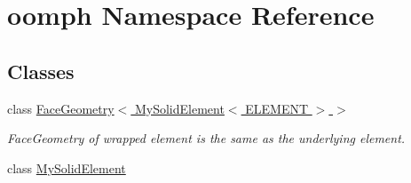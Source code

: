 \hypertarget{namespaceoomph}{}\section{oomph Namespace Reference}
\label{namespaceoomph}
\subsection*{Classes}
\begin{DoxyCompactItemize}
\item 
class \hyperlink{classoomph_1_1FaceGeometry_3_01MySolidElement_3_01ELEMENT_01_4_01_4}{Face\+Geometry$<$ My\+Solid\+Element$<$ E\+L\+E\+M\+E\+N\+T $>$ $>$}
\begin{DoxyCompactList}\small\item\em Face\+Geometry of wrapped element is the same as the underlying element. \end{DoxyCompactList}\item 
class \hyperlink{classoomph_1_1MySolidElement}{My\+Solid\+Element}
\end{DoxyCompactItemize}
